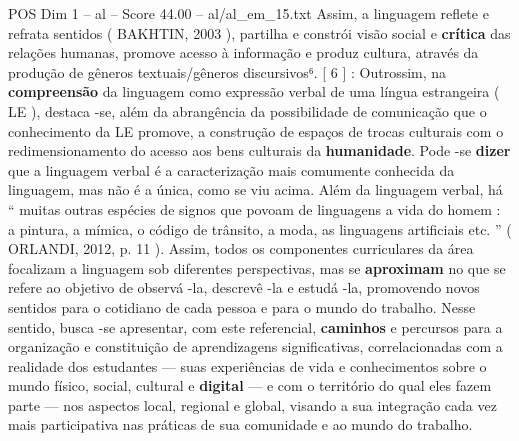 \begin{textsample}{POS Dim 1 – al – Score 44.00 – al/al\_em\_15.txt}
Assim, a linguagem reflete e refrata sentidos ( BAKHTIN, 2003 ), partilha e constrói visão social e \textbf{crítica} das relações humanas, promove acesso à informação e produz cultura, através da produção de gêneros textuais/gêneros discursivos⁶. [ 6 ] : Outrossim, na \textbf{compreensão} da linguagem como expressão verbal de uma língua estrangeira ( LE ), destaca -se, além da abrangência da possibilidade de comunicação que o conhecimento da LE promove, a construção de espaços de trocas culturais com o redimensionamento do acesso aos bens culturais da \textbf{humanidade}.
Pode -se \textbf{dizer} que a linguagem verbal é a caracterização mais comumente conhecida da linguagem, mas não é a única, como se viu acima.
Além da linguagem verbal, há “ muitas outras espécies de signos que povoam de linguagens a vida do homem : a pintura, a mímica, o código de trânsito, a moda, as linguagens artificiais etc. ” ( ORLANDI, 2012, p. 11 ).
Assim, todos os componentes curriculares da área focalizam a linguagem sob diferentes perspectivas, mas se \textbf{aproximam} no que se refere ao objetivo de observá -la, descrevê -la e estudá -la, promovendo novos sentidos para o cotidiano de cada pessoa e para o mundo do trabalho.
Nesse sentido, busca -se apresentar, com este referencial, \textbf{caminhos} e percursos para a organização e constituição de aprendizagens significativas, correlacionadas com a realidade dos estudantes — suas experiências de vida e conhecimentos sobre o mundo físico, social, cultural e \textbf{digital} — e com o território do qual eles fazem parte — nos aspectos local, regional e global, visando a sua integração cada vez mais participativa nas práticas de sua comunidade e ao mundo do trabalho.

\end{textsample}
